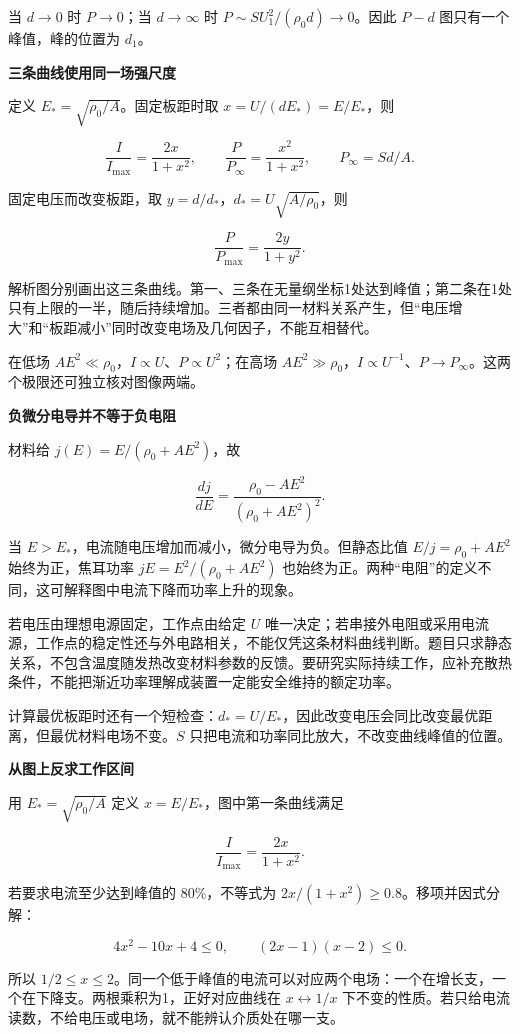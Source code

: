 \documentclass[12pt,a4paper,UTF8]{ctexart}
\begin{document}
当 \(d\to0\) 时 \(P\to0\)；当 \(d\to\infty\) 时
\(P\sim SU_1^2/(\rho_0d)\to0\)。因此 \(P-d\) 图只有一个峰值，峰的位置为
\(d_1\)。

\textbf{三条曲线使用同一场强尺度}

定义 \(E_*=\sqrt{\rho_0/A}\)。固定板距时取 \(x=U/(dE_*)=E/E_*\)，则

\[\frac I{I_{\max}}=\frac{2x}{1+x^2},\qquad \frac P{P_\infty}=\frac{x^2}{1+x^2},\qquad P_\infty=Sd/A.\]

固定电压而改变板距，取 \(y=d/d_*\)，\(d_*=U\sqrt{A/\rho_0}\)，则

\[\frac P{P_{\max}}=\frac{2y}{1+y^2}.\]

解析图分别画出这三条曲线。第一、三条在无量纲坐标1处达到峰值；第二条在1处只有上限的一半，随后持续增加。三者都由同一材料关系产生，但``电压增大''和``板距减小''同时改变电场及几何因子，不能互相替代。

在低场 \(AE^2\ll\rho_0\)，\(I\propto U\)、\(P\propto U^2\)；在高场
\(AE^2\gg\rho_0\)，\(I\propto U^{-1}\)、\(P\to P_\infty\)。这两个极限还可独立核对图像两端。

\textbf{负微分电导并不等于负电阻}

材料给 \(j(E)=E/(\rho_0+AE^2)\)，故

\[\frac{dj}{dE}=\frac{\rho_0-AE^2}{(\rho_0+AE^2)^2}.\]

当 \(E>E_*\)，电流随电压增加而减小，微分电导为负。但静态比值
\(E/j=\rho_0+AE^2\) 始终为正，焦耳功率 \(jE=E^2/(\rho_0+AE^2)\)
也始终为正。两种``电阻''的定义不同，这可解释图中电流下降而功率上升的现象。

若电压由理想电源固定，工作点由给定 \(U\)
唯一决定；若串接外电阻或采用电流源，工作点的稳定性还与外电路相关，不能仅凭这条材料曲线判断。题目只求静态关系，不包含温度随发热改变材料参数的反馈。要研究实际持续工作，应补充散热条件，不能把渐近功率理解成装置一定能安全维持的额定功率。

计算最优板距时还有一个短检查：\(d_*=U/E_*\)，因此改变电压会同比改变最优距离，但最优材料电场不变。\(S\)
只把电流和功率同比放大，不改变曲线峰值的位置。

\textbf{从图上反求工作区间}

用 \(E_* =\sqrt{\rho_0/A}\) 定义 \(x=E/E_*\)，图中第一条曲线满足

\[\frac I{I_{\max}}=\frac{2x}{1+x^2}.\]

若要求电流至少达到峰值的 \(80\%\)，不等式为
\(2x/(1+x^2)\ge0.8\)。移项并因式分解：

\[4x^2-10x+4\le0,\qquad (2x-1)(x-2)\le0.\]

所以
\(1/2\le x\le2\)。同一个低于峰值的电流可以对应两个电场：一个在增长支，一个在下降支。两根乘积为1，正好对应曲线在
\(x\leftrightarrow1/x\)
下不变的性质。若只给电流读数，不给电压或电场，就不能辨认介质处在哪一支。
\end{document}
